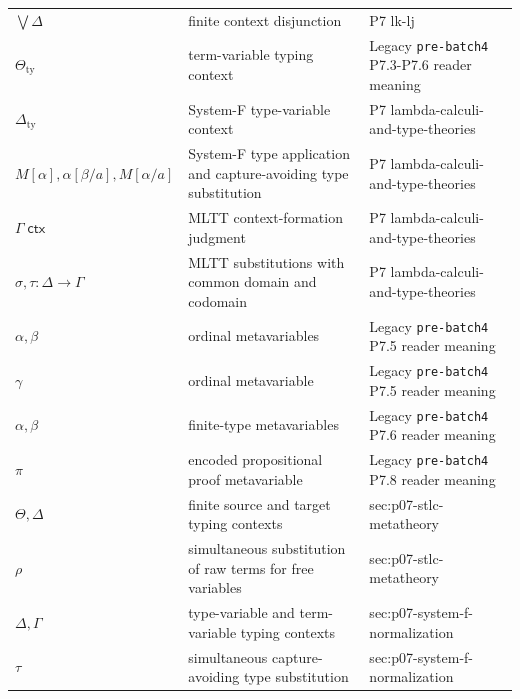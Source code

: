 \begin{longtable}{@{}p{}p{}p{}@{}}
\(\bigvee\Delta\) & finite context disjunction & P7 lk-\allowbreak{}lj \\
\(\Theta_{\mathrm{ty}}\) & term-variable typing context & Legacy \texttt{pre-\allowbreak{}batch4} P7.\allowbreak{}3-\allowbreak{}P7.\allowbreak{}6 reader meaning \\
\(\Delta_{\mathrm{ty}}\) & System-F type-variable context & P7 lambda-\allowbreak{}calculi-\allowbreak{}and-\allowbreak{}type-\allowbreak{}theories \\
\(M[\alpha],\allowbreak \alpha[\beta/a],\allowbreak M[\alpha/a]\) & System-F type application and capture-avoiding type substitution & P7 lambda-\allowbreak{}calculi-\allowbreak{}and-\allowbreak{}type-\allowbreak{}theories \\
\(\Gamma\;\mathsf{ctx}\) & MLTT context-formation judgment & P7 lambda-\allowbreak{}calculi-\allowbreak{}and-\allowbreak{}type-\allowbreak{}theories \\
\(\sigma,\allowbreak \tau:\Delta\to\Gamma\) & MLTT substitutions with common domain and codomain & P7 lambda-\allowbreak{}calculi-\allowbreak{}and-\allowbreak{}type-\allowbreak{}theories \\
\(\alpha,\allowbreak \beta\) & ordinal metavariables & Legacy \texttt{pre-\allowbreak{}batch4} P7.\allowbreak{}5 reader meaning \\
\(\gamma\) & ordinal metavariable & Legacy \texttt{pre-\allowbreak{}batch4} P7.\allowbreak{}5 reader meaning \\
\(\alpha,\allowbreak \beta\) & finite-type metavariables & Legacy \texttt{pre-\allowbreak{}batch4} P7.\allowbreak{}6 reader meaning \\
\(\pi\) & encoded propositional proof metavariable & Legacy \texttt{pre-\allowbreak{}batch4} P7.\allowbreak{}8 reader meaning \\
\(\Theta,\allowbreak \Delta\) & finite source and target typing contexts & sec:\allowbreak{}p07-\allowbreak{}stlc-\allowbreak{}metatheory \\
\(\rho\) & simultaneous substitution of raw terms for free variables & sec:\allowbreak{}p07-\allowbreak{}stlc-\allowbreak{}metatheory \\
\(\Delta,\allowbreak \Gamma\) & type-variable and term-variable typing contexts & sec:\allowbreak{}p07-\allowbreak{}system-\allowbreak{}f-\allowbreak{}normalization \\
\(\tau\) & simultaneous capture-avoiding type substitution & sec:\allowbreak{}p07-\allowbreak{}system-\allowbreak{}f-\allowbreak{}normalization \\

\end{longtable}
